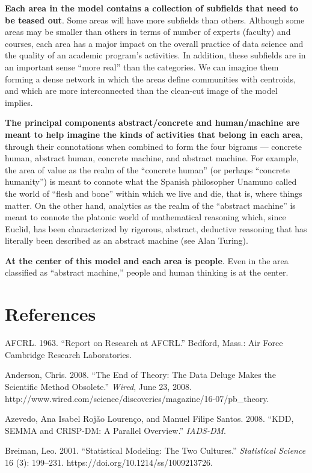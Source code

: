 \documentclass[
  letterpaper,
  DIV=11,
  numbers=noendperiod]{scrreprt}
\begin{document}
\textbf{Each area in the model contains a collection of subfields that
need to be teased out}. Some areas will have more subfields than others.
Although some areas may be smaller than others in terms of number of
experts (faculty) and courses, each area has a major impact on the
overall practice of data science and the quality of an academic
program's activities. In addition, these subfields are in an important
sense ``more real'' than the categories. We can imagine them forming a
dense network in which the areas define communities with centroids, and
which are more interconnected than the clean-cut image of the model
implies.

\textbf{The principal components abstract/concrete and human/machine are
meant to help imagine the kinds of activities that belong in each area},
through their connotations when combined to form the four bigrams ---
concrete human, abstract human, concrete machine, and abstract machine.
For example, the area of value as the realm of the ``concrete human''
(or perhaps ``concrete humanity'') is meant to connote what the Spanish
philosopher Unamuno called the world of ``flesh and bone'' within which
we live and die, that is, where things matter. On the other hand,
analytics as the realm of the ``abstract machine'' is meant to connote
the platonic world of mathematical reasoning which, since Euclid, has
been characterized by rigorous, abstract, deductive reasoning that has
literally been described as an abstract machine (see Alan Turing).

\textbf{At the center of this model and each area is people}. Even in
the area classified as ``abstract machine,'' people and human thinking
is at the center.

\hypertarget{references}{%
\section{References}\label{references}}

AFCRL. 1963. ``Report on Research at AFCRL.'' Bedford, Mass.: Air Force
Cambridge Research Laboratories.

Anderson, Chris. 2008. ``The End of Theory: The Data Deluge Makes the
Scientific Method Obsolete.'' \emph{Wired}, June 23, 2008.
http://www.wired.com/science/discoveries/magazine/16-07/pb\_theory.

Azevedo, Ana Isabel Rojão Lourenço, and Manuel Filipe Santos. 2008.
``KDD, SEMMA and CRISP-DM: A Parallel Overview.'' \emph{IADS-DM}.

Breiman, Leo. 2001. ``Statistical Modeling: The Two Cultures.''
\emph{Statistical Science} 16 (3): 199--231.
https://doi.org/10.1214/ss/1009213726.
\end{document}
